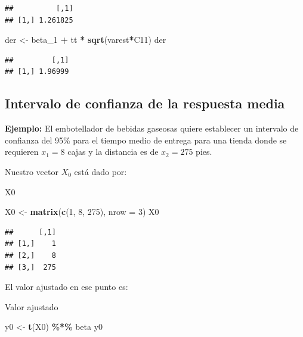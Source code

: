 \documentclass[
]{book}
\newenvironment{Shaded}{\begin{snugshade}}{\end{snugshade}}
\newcommand{\AttributeTok}[1]{\textcolor[rgb]{0.13,0.29,0.53}{#1}}
\newcommand{\DecValTok}[1]{\textcolor[rgb]{0.00,0.00,0.81}{#1}}
\newcommand{\FunctionTok}[1]{\textcolor[rgb]{0.13,0.29,0.53}{\textbf{#1}}}
\newcommand{\NormalTok}[1]{#1}
\newcommand{\OtherTok}[1]{\textcolor[rgb]{0.56,0.35,0.01}{#1}}
\newcommand{\SpecialCharTok}[1]{\textcolor[rgb]{0.81,0.36,0.00}{\textbf{#1}}}
\begin{document}
\begin{verbatim}
##          [,1]
## [1,] 1.261825
\end{verbatim}

\begin{Shaded}
\begin{Highlighting}[]
\NormalTok{der }\OtherTok{\textless{}{-}}\NormalTok{ beta\_1 }\SpecialCharTok{+}\NormalTok{ tt }\SpecialCharTok{*} \FunctionTok{sqrt}\NormalTok{(varest}\SpecialCharTok{*}\NormalTok{C11)}
\NormalTok{der}
\end{Highlighting}
\end{Shaded}

\begin{verbatim}
##         [,1]
## [1,] 1.96999
\end{verbatim}

\subsection{Intervalo de confianza de la respuesta media}\label{intervalo-de-confianza-de-la-respuesta-media}

\textbf{Ejemplo:} El embotellador de bebidas gaseosas quiere establecer un intervalo de confianza del 95\% para el tiempo medio de entrega para una tienda donde se requieren \(x_1=8\) cajas y la distancia es de \(x_2=275\) pies.

Nuestro vector \(X_0\) está dado por:

X0

\begin{Shaded}
\begin{Highlighting}[]
\NormalTok{X0 }\OtherTok{\textless{}{-}} \FunctionTok{matrix}\NormalTok{(}\FunctionTok{c}\NormalTok{(}\DecValTok{1}\NormalTok{, }\DecValTok{8}\NormalTok{, }\DecValTok{275}\NormalTok{), }\AttributeTok{nrow =} \DecValTok{3}\NormalTok{)}
\NormalTok{X0}
\end{Highlighting}
\end{Shaded}

\begin{verbatim}
##      [,1]
## [1,]    1
## [2,]    8
## [3,]  275
\end{verbatim}

El valor ajustado en ese punto es:

Valor ajustado

\begin{Shaded}
\begin{Highlighting}[]
\NormalTok{y0 }\OtherTok{\textless{}{-}} \FunctionTok{t}\NormalTok{(X0) }\SpecialCharTok{\%*\%}\NormalTok{ beta}
\NormalTok{y0}
\end{Highlighting}
\end{Shaded}
\end{document}
